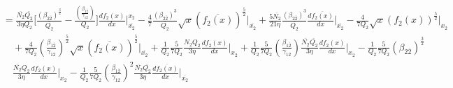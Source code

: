 \documentclass[fleqn, 10pt]{article}
\begin{document}
            \begin{equation*}
            \begin{split}
            &=\frac{\overline{N_2}\overline{Q_2}}{3\eta Q_2} \biggl[\frac{(\beta_{2\overline{2}})^\frac{3}{2}}{\overline{Q_2}} -  \frac{\left(\frac{\beta_{1\overline{2}}}{\gamma_{12}}\right)}{Q_2} \biggr] \frac{df_2(x)}{dx}\Bigg|^{x_2}_{\overline{x_2}} -   \frac{4}{7} \frac{(\beta_{2\overline{2}})^3}{\overline{Q_2}}\sqrt{x} (\overline{f_2(x)})^\frac{5}{2} \Bigg|_{\overline{x_2}} +   \frac{5 \overline{N_2}}{21 \eta} \frac{(\beta_{2\overline{2}})^3}{\overline{Q_2}}\frac{d\overline{f_2(x)}}{dx}\Bigg|_{\overline{x_2}} -   \frac{4}{7 Q_2} \sqrt{x} (f_2(x))^\frac{5}{2} \Bigg|_{x_2} \\ & \quad +  \frac{4}{7Q_2} \left(\frac{\beta_{1\overline{2}}}{\gamma_{12}}\right)^\frac{5}{2} \sqrt{x} (\overline{f_2(x)})^\frac{5}{2} \Bigg|_{\overline{x_2}} +   \frac{1}{Q_2} \frac{5}{7Q_2} \frac{N_2Q_2}{3\eta} \frac{df_2(x)}{dx} \Bigg|_{x_2} +   \frac{1}{Q_2} \frac{5}{7Q_2} \left(\frac{\beta_{1\overline{2}}}{\gamma_{12}}\right) \frac{\overline{N_2}\overline{Q_2}}{3\eta} \frac{df_2(x)}{dx} \Bigg|_{x_2} -  \frac{1}{Q_2} \frac{5}{7Q_2} (\beta_{2\overline{2}})^\frac{3}{2} \\ & \quad \frac{\overline{N_2}Q_2}{3\eta} \frac{df_2(x)}{dx} \Bigg|_{x_2}  -  \frac{1}{Q_2} \frac{5}{7Q_2}\left(\frac{\beta_{1\overline{2}}}{\gamma_{12}}\right)^2 \frac{\overline{N_2}\overline{Q_2}}{3\eta} \frac{d\overline{f_2(x)}}{dx}\Bigg|_{\overline{x_2}}
            \end{split}
            \end{equation*}
\end{document}
